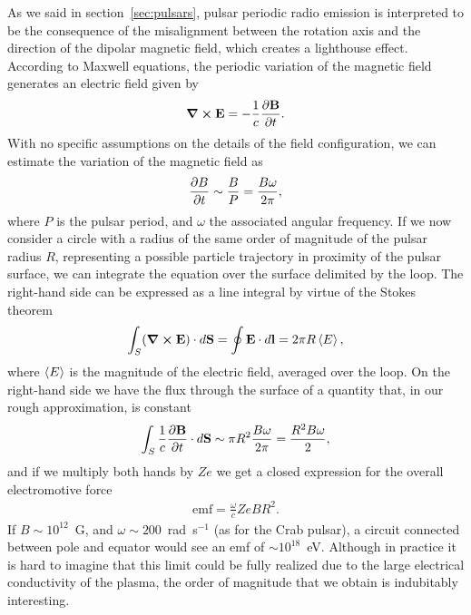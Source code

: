 As we said in section~\ref{sec:pulsars}, pulsar periodic radio emission is interpreted
to be the consequence of the misalignment between the rotation axis and the direction
of the dipolar magnetic field, which creates a lighthouse effect. According to Maxwell
equations, the periodic variation of the magnetic field generates an electric field
given by
\begin{align*}
  \curl{\vb{E}} = -\frac{1}{c}\pdv{\vb{B}}{t}.
\end{align*}
With no specific assumptions on the details of the field configuration, we can estimate
the variation of the magnetic field as
\begin{align*}
  \pdv{B}{t} \sim \frac{B}{P} = \frac{B\omega}{2\pi},
\end{align*}
where $P$ is the pulsar period, and $\omega$ the associated angular frequency.
If we now consider a circle with a radius of the same order of magnitude of the
pulsar radius $R$, representing a possible particle trajectory in proximity of the
pulsar surface, we can integrate the equation over the surface delimited by the
loop. The right-hand side can be expressed as a line integral by virtue of the
Stokes theorem
\begin{align*}
  \int_S (\curl{\vb{E}}) \cdot d\vb{S} = \oint \vb{E} \cdot d\vb{l} = 2\pi R \left<E\right>,
\end{align*}
where $\left<E\right>$ is the magnitude of the electric field, averaged over the loop. On
the right-hand side we have the flux through the surface of a quantity that, in our
rough approximation, is constant
\begin{align*}
  \int_S \frac{1}{c}\pdv{\vb{B}}{t} \cdot d\vb{S} \sim
  \pi R^2 \frac{B\omega}{2\pi} = \frac{R^2 B \omega}{2},
\end{align*}
and if we multiply both hands by $Ze$ we get a closed
expression for the overall electromotive force
\begin{align*}
  \text{emf} = \frac{\omega}{c} Ze B R^2.
\end{align*}
If $B \sim 10^{12}$~G, and $\omega \sim 200$~rad~s$^{-1}$ (as for the Crab pulsar),
a circuit connected between pole and equator would see an emf of $\sim 10^{18}$~eV.
Although in practice it is hard to imagine that this limit could be fully realized
due to the large electrical conductivity of the plasma, the order of magnitude that
we obtain is indubitably interesting.



